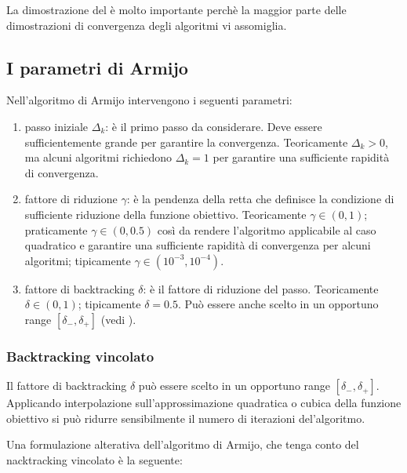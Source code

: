La dimostrazione del  è molto importante perchè
la maggior parte delle dimostrazioni di convergenza degli algoritmi vi
assomiglia.


\subsection{I parametri di Armijo}
\label{sec:methods.armijo.parameters}
Nell'algoritmo di Armijo intervengono i seguenti parametri:

\begin{enumerate}
	\item passo iniziale $\Delta_{k}$: è il primo passo da considerare.
	Deve essere sufficientemente grande per garantire la convergenza.
	Teoricamente $\Delta_{k}>0$, ma alcuni algoritmi richiedono $\Delta_{k}=1$
	per garantire una sufficiente rapidità di convergenza.

	\item fattore di riduzione $\gamma$: è la pendenza della retta che definisce
	la condizione di sufficiente riduzione della funzione obiettivo.
	Teoricamente $\gamma\in(0,1)$; praticamente $\gamma\in(0,0.5)$ così da
	rendere l'algoritmo applicabile al caso quadratico e garantire una
	sufficiente rapidità di convergenza per alcuni algoritmi; tipicamente
	$\gamma\in(10^{-3},10^{-4})$.

	\item fattore di backtracking $\delta$: è il fattore di riduzione del passo.
	Teoricamente $\delta\in(0,1)$; tipicamente $\delta=0.5$.
	Può essere anche scelto in un opportuno range $[\delta_{-},\delta_{+}]$
	(vedi ).
\end{enumerate}


\subsubsection{Backtracking vincolato}
\label{sec:methods.armijo.backtracking.bounded}
Il fattore di backtracking $\delta$ può essere scelto in un opportuno range
$[\delta_{-},\delta_{+}]$. Applicando interpolazione sull'approssimazione
quadratica o cubica della funzione obiettivo si può ridurre sensibilmente il
numero di iterazioni del'algoritmo.

Una formulazione alterativa dell'algoritmo di Armijo, che tenga conto del
nacktracking vincolato è la seguente:

